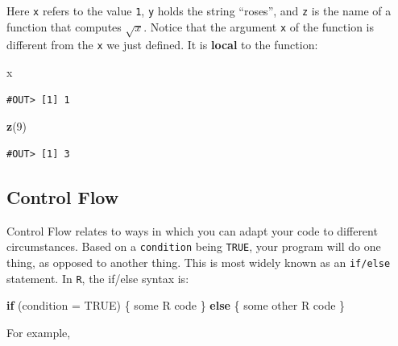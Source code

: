 \documentclass[]{book}
\newenvironment{Shaded}{\begin{snugshade}}{\end{snugshade}}
\newcommand{\ControlFlowTok}[1]{\textcolor[rgb]{0.13,0.29,0.53}{\textbf{#1}}}
\newcommand{\DataTypeTok}[1]{\textcolor[rgb]{0.13,0.29,0.53}{#1}}
\newcommand{\DecValTok}[1]{\textcolor[rgb]{0.00,0.00,0.81}{#1}}
\newcommand{\KeywordTok}[1]{\textcolor[rgb]{0.13,0.29,0.53}{\textbf{#1}}}
\newcommand{\NormalTok}[1]{#1}
\newcommand{\OtherTok}[1]{\textcolor[rgb]{0.56,0.35,0.01}{#1}}
\begin{document}
Here \texttt{x} refers to the value \texttt{1}, \texttt{y} holds the string ``roses'', and \texttt{z} is the name of a function that computes \(\sqrt{x}\). Notice that the argument \texttt{x} of the function is different from the \texttt{x} we just defined. It is \textbf{local} to the function:

\begin{Shaded}
\begin{Highlighting}[]
\NormalTok{x}
\end{Highlighting}
\end{Shaded}

\begin{verbatim}
#OUT> [1] 1
\end{verbatim}

\begin{Shaded}
\begin{Highlighting}[]
\KeywordTok{z}\NormalTok{(}\DecValTok{9}\NormalTok{)}
\end{Highlighting}
\end{Shaded}

\begin{verbatim}
#OUT> [1] 3
\end{verbatim}

\hypertarget{control-flow}{%
\subsection{Control Flow}\label{control-flow}}

Control Flow relates to ways in which you can adapt your code to different circumstances. Based on a \texttt{condition} being \texttt{TRUE}, your program will do one thing, as opposed to another thing. This is most widely known as an \texttt{if/else} statement. In \texttt{R}, the if/else syntax is:

\begin{Shaded}
\begin{Highlighting}[]
\ControlFlowTok{if}\NormalTok{ (}\DataTypeTok{condition =} \OtherTok{TRUE}\NormalTok{) \{}
\NormalTok{  some R code}
\NormalTok{\} }\ControlFlowTok{else}\NormalTok{ \{}
\NormalTok{  some other R code}
\NormalTok{\}}
\end{Highlighting}
\end{Shaded}

For example,
\end{document}
